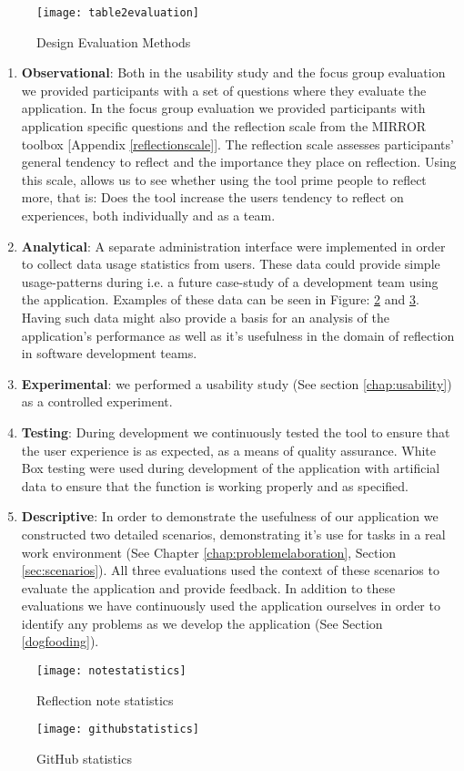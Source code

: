 \begin{figure}[H]
\centering
	\texttt{[image: table2evaluation]}
\caption{Design Evaluation Methods}
\label{table2evaluation}
\end{figure}
\begin{enumerate}
	\item \textbf{Observational}: Both in the usability study and the focus group evaluation we provided participants with a set of questions where they evaluate the application. In the focus group evaluation we provided participants with application specific questions and the reflection scale from the MIRROR toolbox [Appendix \ref{reflectionscale}]. The reflection scale assesses participants' general tendency to reflect and the importance they place on reflection. Using this scale, allows us to see whether using the tool prime people to reflect more, that is: Does the tool increase the users tendency to reflect on experiences, both individually and as a team.
	\item \textbf{Analytical}: A separate administration interface were implemented in order to collect data usage statistics from users. These data could provide simple usage-patterns during i.e. a future case-study of a development team using the application. Examples of these data can be seen in Figure: \ref{notestatistics} and  \ref{githubstatistics}. Having such data might also provide a basis for an analysis of the application's performance as well as it's usefulness in the domain of reflection in software development teams. 
	\item \textbf{Experimental}: we performed a usability study (See section \ref{chap:usability}) as a controlled experiment.
	\item \textbf{Testing}: During development we continuously tested the tool to ensure that the user experience is as expected, as a means of quality assurance. White Box testing were used during development of the application with artificial data to ensure that the function is working properly and as specified. 
	\item \textbf{Descriptive}: In order to demonstrate the usefulness of our application we constructed two detailed scenarios, demonstrating it's use for tasks in a real work environment (See Chapter \ref{chap:problemelaboration}, Section \ref{sec:scenarios}). All three evaluations used the context of these scenarios to evaluate the application and provide feedback. In addition to these evaluations we have continuously used the application ourselves in order to identify any problems as we develop the application (See Section \ref{dogfooding}).
\end{enumerate}
\begin{figure}[!htpb]
\centering
	\texttt{[image: notestatistics]}
\caption{Reflection note statistics}
\label{notestatistics}
\end{figure}
\begin{figure}[!htpb]
\centering
	\texttt{[image: githubstatistics]}
\caption{GitHub statistics}
\label{githubstatistics}
\end{figure}

